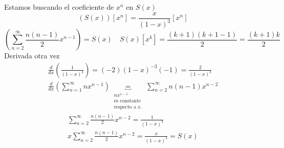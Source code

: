 \documentclass[../main.tex]{subfiles}
\begin{document}
Estamos buscando el coeficiente de $x^n$ en $S(x)$
\[
	\left(
		S(x)
	\right)
	\left[
		x^n
	\right]
	=
	\frac{x}{(1-x)^3}
	\left[
		x^n
	\right]
\]
\[
	\left(
		\sum_{n=2}^\infty
		\frac{n(n-1)}{2}
		x^{n-1}
	\right) =
	S(x) \quad
	S(x)[x^k] = \frac{(k+1)(k+1-1)}{2} =
	\boxed
	{
		\frac{(k+1)k}{2}
	}
\]
Derivada otra vez
\begin{gather*}
	\frac{d}{dx}
	\left(
		\frac{1}{(1-x)^2}
	\right)
	=
	(-2)(1-x)^{-3}(-1) = \frac{2}{(1-x)^3} \\
	\frac{d}{dx}
	\left(
		\sum_{n=1}^\infty
		nx^{n-1}
	\right)
	\underbrace
	{
		=
	}_
	{
		\substack
		{
			nx^{1-1}\\
			\text{es constante}\\
			\text{respecto a $x$.}
		}
	}
	\sum_{n=2}^\infty
	n(n-1)
	x^{n-2}
\end{gather*}
\begin{gather*}
	\sum_{n=2}^\infty
	\frac{n(n-1)}{2}
	x^{n-2} = \frac{1}{(1-x)^3} \\
	x\sum_{n=2}^\infty
	\frac{n(n-1)}{2}
	x^{n-2} = \frac{x}{(1-x)^3} = S(x)
\end{gather*}
\end{document}
